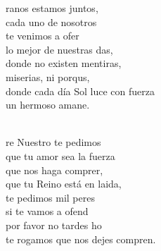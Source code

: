\begin{cancion}%
	ranos estamos juntos,\\
cada uno de nosotros \\
	te venimos a ofer\\
	lo mejor de nuestras das,\\
donde no existen mentiras, \\
	miserias, ni porqus,\\
	donde cada día Sol luce con fuerza\\
	un hermoso amane.\\\jump\\
	\begin{chorus}%
	re Nuestro te pedimos\\
que tu amor sea la fuerza\\
	que nos haga comprer,\\
	que tu Reino está en laida,\\
	te pedimos mil peres\\
	si te vamos a ofend\\
	por favor no tardes ho \\
	te rogamos que nos dejes compren.\\
	\end{chorus}%
	\jump\\
\end{cancion}%
